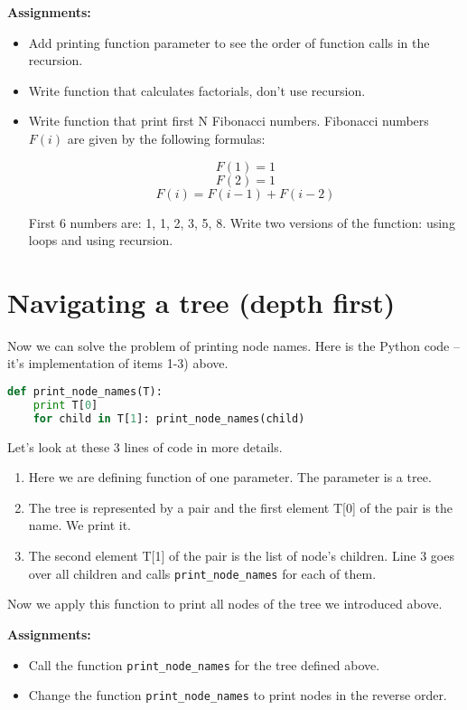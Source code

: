 \bigskip
\begin{tcolorbox}
\textbf{Assignments:}
\begin{itemize}
\item Add printing function parameter to see the order of function calls
in the recursion.
\item Write function that calculates factorials, don't use recursion.
\item Write function that print first N Fibonacci numbers. 
Fibonacci numbers $F(i)$ are given by the following
formulas:

$$F(1) = 1$$ $$F(2) = 1$$ $$F(i) = F(i-1) + F(i-2) $$

First 6 numbers are: 1, 1, 2, 3, 5, 8.
Write two versions of the function: using loops and using recursion.
\end{itemize}
\end{tcolorbox}


\section{Navigating a tree (depth first)}
Now we can solve the problem of printing node names.
Here is the Python code --
it's implementation of items 1-3) above.

\begin{lstlisting}[style=codelst,language=Python]
def print_node_names(T):
    print T[0]
    for child in T[1]: print_node_names(child)
\end{lstlisting}

Let's look at these 3 lines of code in more details.

\begin{leftborder}
\begin{enumerate}
\item Here we are defining function of one parameter. The parameter is a tree.
\item The tree is represented by a pair and the first element T[0] of
the pair is the name. We print it.
\item The second element T[1] of the pair is the list of node's children. 
Line 3 goes over all children and calls
\lstinline{print_node_names} for each of them.
\end{enumerate}
\end{leftborder}

Now we apply this function to print all nodes of the tree we introduced above.
\bigskip
\begin{tcolorbox}
\textbf{Assignments:}
\begin{itemize}
\item Call the function \lstinline{print_node_names}
for the tree defined above. 
\item Change the function \lstinline{print_node_names}
to print nodes in the reverse order.
\end{itemize}
\end{tcolorbox}


